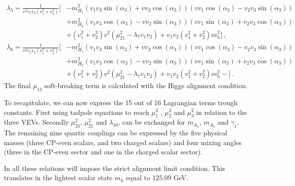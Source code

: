 %
\begin{equation}
\begin{split}
\lambda_5 = \frac{1}{v^2 v_1 v_2 \left(v_1^2+v_2^2\right)} \Bigg[ 
& -m_{H_1}^2 \left(v_1 v_3 \sin (\alpha_3) + v v_2 \cos (\alpha_3)\right) \left(v v_1 \cos (\alpha_3)-v_2 v_3  \sin (\alpha_3)\right) \\ & + m_{H_2}^2 \left(v_1 v_3 \cos (\alpha_3)  -v v_2 \sin (\alpha_3)\right) \left(v v_1 \sin (\alpha_3) + v_2 v_3 \cos (\alpha_3)\right) \\ & +\left(v_1^2+v_2^2\right) v^2 \left(\mu_{21}^2-\lambda_7 v_1 v_2\right) + v_1 v_2 \left(v_1^2+v_2^2\right) m_h^2 \Bigg]  \ , 
\end{split} 
\end{equation}
%
\begin{equation}
\begin{split}
\lambda_6 = \frac{1}{v^2 v_1 v_2 \left(v_1^2+v_2^2\right)} \Bigg[ &- m_{H_1}^2 \left(v_1 v_3 \sin (\alpha_3)+v v_2 \cos (\alpha_3)\right) \left(v v_1 \cos (\alpha_3)-v_2 v_3 \sin (\alpha_3)\right)  \\ & +  m_{H_2}^2 \left(v_1 v_3 \cos (\alpha_3) -v v_2 \sin (\alpha_3)\right) \left(v v_1 \sin (\alpha_3)+v_2 v_3 \cos (\alpha_3)\right) \\ & +\left(v_1^2+v_2^2\right) v^2 \left(\mu_{21}^2-\lambda_7 v_1 v_2\right) + v_1 v_2 \left(v_1^2+v_2^2\right) m_h^2- \Bigg] \ . 
\end{split} 
\end{equation}
%
The final $\mu_{13}$ soft-breaking term is calculated with the Higgs alignment condition. 

To recapitulate, we can now express the 15 out of 16 Lagrangian terms trough constants. 
%
First using tadpole equations to reach $\mu_{1}^2$ , $\mu_{2}^2$ and $\mu_{3}^2$ in relation to the three VEVs. Secondly $\mu_{23}^2$, $\mu_{21}^2$ and $\lambda_{10}$, can be exchanged for $m_{A_1}$, $m_{A_2}$ and $\gamma_1$. 
%
The remaining nine quartic couplings can be expressed by the five physical masses (three CP-even scalars, and two charged scalars) and four mixing angles (three in the CP-even sector and one in the charged scalar sector). 

In all these relations will impose the strict alignment limit condition. This translates in the lightest scalar state $m_h$ equal to $125.09$ GeV.
%

